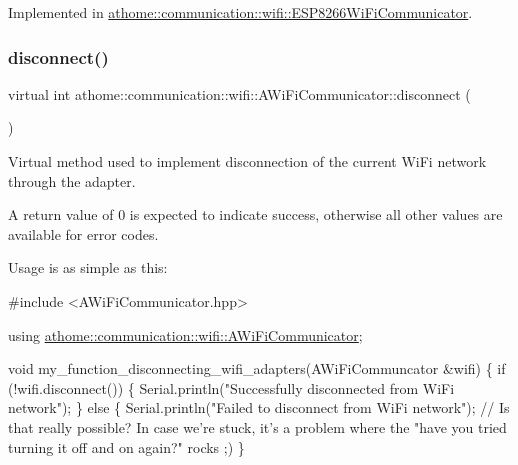 Implemented in \mbox{\hyperlink{classathome_1_1communication_1_1wifi_1_1_e_s_p8266_wi_fi_communicator_a159a93b350df135daa967665c9e53e2f}{athome\+::communication\+::wifi\+::\+E\+S\+P8266\+Wi\+Fi\+Communicator}}.

\mbox{\label{classathome_1_1communication_1_1wifi_1_1_a_wi_fi_communicator_a6131240ac0daa0f9fb4d46871feea4c2}} 
\subsubsection{\texorpdfstring{disconnect()}{disconnect()}}
{\footnotesize\ttfamily virtual int athome\+::communication\+::wifi\+::\+A\+Wi\+Fi\+Communicator\+::disconnect (\begin{DoxyParamCaption}{ }\end{DoxyParamCaption})\hspace{0.3cm}{\ttfamily [pure virtual]}}

Virtual method used to implement disconnection of the current Wi\+Fi network through the adapter.

A return value of 0 is expected to indicate success, otherwise all other values are available for error codes.

Usage is as simple as this\+:


\begin{DoxyCode}
\textcolor{preprocessor}{#include <AWiFiCommunicator.hpp>}

\textcolor{keyword}{using} \mbox{\hyperlink{classathome_1_1communication_1_1wifi_1_1_a_wi_fi_communicator}{athome::communication::wifi::AWiFiCommunicator}};

\textcolor{keywordtype}{void} my\_function\_disconnecting\_wifi\_adapters(AWiFiCommuncator &wifi) \{
  \textcolor{keywordflow}{if} (!wifi.disconnect()) \{
    Serial.println(\textcolor{stringliteral}{"Successfully disconnected from WiFi network"});
  \} \textcolor{keywordflow}{else} \{
    Serial.println(\textcolor{stringliteral}{"Failed to disconnect from WiFi network"}); \textcolor{comment}{// Is that really possible? In case we're
       stuck, it's a problem where the "have you tried turning it off and on again?" rocks ;)}
\}
\end{DoxyCode}
 

